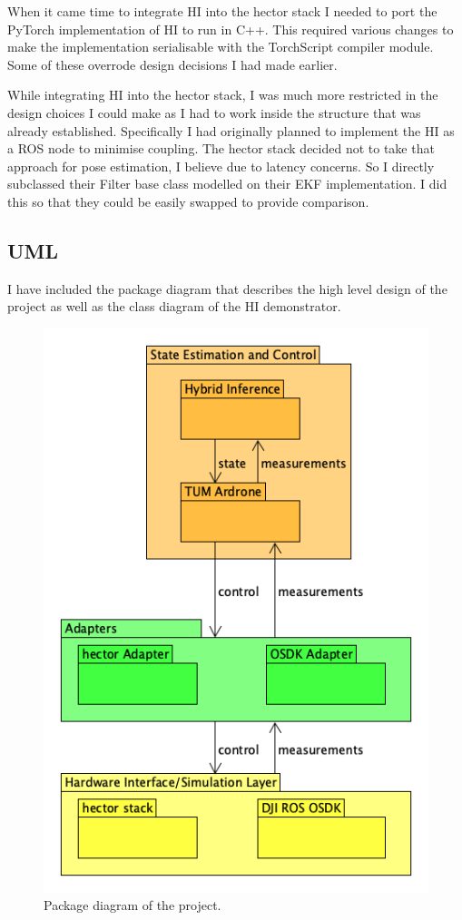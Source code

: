 \documentclass[]{../resources/final_report}
\begin{document}
When it came time to integrate HI into the hector stack I needed to port the PyTorch implementation of 
HI to run in C++. This required various changes to make the implementation serialisable with the 
TorchScript compiler module. Some of these overrode design decisions I had made earlier.

While integrating HI into the hector stack, I was much more restricted in the design choices I could 
make as I had to work inside the structure that was already established. Specifically I had originally 
planned to implement the HI as a ROS node to minimise coupling. The hector stack decided not to take 
that approach for pose estimation, I believe due to latency concerns. So I directly subclassed their
Filter base class modelled on their EKF implementation. I did this so that they could be easily 
swapped to provide comparison.

\subsection{UML}

I have included the package diagram that describes the high level design 
of the project as well as the class diagram of the HI demonstrator.

\begin{figure}[h!]
  \centering
  \includegraphics[height=0.30\textheight]{hybrid-inference-package-uml.png}  
  \caption{Package diagram of the project.}
  \label{}
\end{figure}
\end{document}

